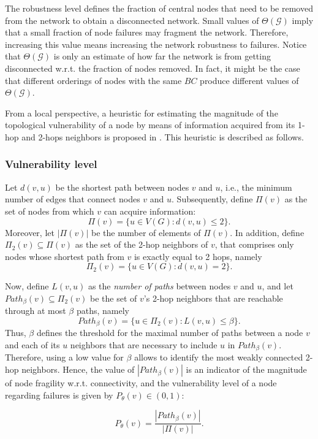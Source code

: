 The robustness level defines the fraction of central nodes that need to be removed from the network to obtain a disconnected network. Small values of $\Theta(\mathcal{G})$ imply that a small fraction of node failures may fragment the network. Therefore, increasing this value means increasing the network robustness to failures. Notice that $\Theta(\mathcal{G})$ is only an estimate of how far the network is from getting disconnected w.r.t. the fraction of nodes removed. In fact, it might be the case that different orderings of nodes with the same $BC$ produce different values of $\Theta(\mathcal{G})$.

From a local perspective, a heuristic for estimating the magnitude of the topological vulnerability of a node by means of information acquired from its 1-hop and 2-hops neighbors is proposed in \cite{ghedini_2015}. This heuristic is described as follows.

\subsubsection{Vulnerability level}

 Let $d(v,u)$ be the shortest path between nodes $v$ and $u$, i.e., the minimum number of edges that connect nodes $v$ and $u$. Subsequently, define $\Pi(v)$ as the set of nodes from which $v$ can acquire information:
$$\Pi(v)=\{u \in V(G) : d(v,u)\leq 2\}.$$
Moreover, let $|\Pi(v)|$ be the number of elements of $\Pi(v)$. In addition, define $\Pi_{2}(v)\subseteq \Pi(v)$ as the set of the 2-hop neighbors of $v$, that comprises only nodes whose shortest path from $v$ is exactly equal to 2 hops, namely
$$\Pi_{2}(v)=\{u \in V(G) : d(v,u)=2\}.$$

Now, define $L(v,u)$ as the \emph{number of paths} between nodes $v$ and $u$, and let $Path_{\beta}(v) \subseteq \Pi_{2}(v)$ be the set of $v$'s 2-hop neighbors that are reachable through at most $\beta$ paths, namely $$Path_{\beta}(v)=\{u \in \Pi_{2}(v): L(v,u) \leq \beta\}.$$
Thus, $\beta$ defines the threshold for the maximal number of paths between a node $v$ and each of its $u$ neighbors that are necessary to include $u$ in $Path_{\beta}(v)$. Therefore, using a low value for $\beta$ allows to identify the most weakly connected 2-hop neighbors. Hence, the value of $|Path_{\beta}(v)|$  is an indicator of the magnitude of node fragility w.r.t. connectivity, and the vulnerability level of a node regarding failures is given by $P_{\theta}(v) \in \left(0,1\right)$:

\begin{equation} \label{eq:vulnerability}
P_{\theta}(v) =  \frac{|Path_{\beta}(v)|}{|\Pi(v)|}.
\end{equation}

